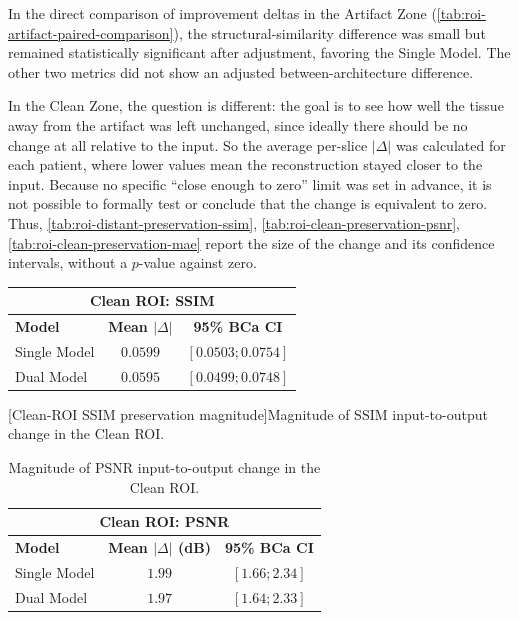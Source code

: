 In the direct comparison of improvement deltas in the Artifact Zone (\autoref{tab:roi-artifact-paired-comparison}), the structural-similarity difference was small but remained statistically significant after adjustment, favoring the Single Model. The other two metrics did not show an adjusted between-architecture difference.

In the Clean Zone, the question is different: the goal is to see how well the tissue away from the artifact was left unchanged, since ideally there should be no change at all relative to the input. So the average per-slice $|\Delta|$ was calculated for each patient, where lower values mean the reconstruction stayed closer to the input. Because no specific ``close enough to zero'' limit was set in advance, it is not possible to formally test or conclude that the change is equivalent to zero. Thus, \autoref{tab:roi-distant-preservation-ssim}, \autoref{tab:roi-clean-preservation-psnr}, \autoref{tab:roi-clean-preservation-mae} report the size of the change and its confidence intervals, without a $p$-value against zero.

\begin{table}[htbp]
\centering
\small
\begin{tabular}{lcc}
\multicolumn{3}{c}{\textbf{Clean ROI: SSIM}} \\[3pt]
\toprule
\textbf{Model} & \textbf{Mean $|\Delta|$} & \textbf{95\% BCa CI} \\
\midrule
Single Model & $0.0599$ & $[0.0503; 0.0754]$ \\
Dual Model & $0.0595$ & $[0.0499; 0.0748]$ \\
\bottomrule
\end{tabular}
\captionsetup{skip=2pt}
[Clean-ROI SSIM preservation magnitude]{Magnitude of SSIM input-to-output change in the Clean ROI.}
\label{tab:roi-distant-preservation-ssim}
\end{table}

\begin{table}[htbp]
\centering
\small
\begin{tabular}{lcc}
\multicolumn{3}{c}{\textbf{Clean ROI: PSNR}} \\[3pt]
\toprule
\textbf{Model} & \textbf{Mean $|\Delta|$ (dB)} & \textbf{95\% BCa CI} \\
\midrule
Single Model & $1.99$ & $[1.66; 2.34]$ \\
Dual Model & $1.97$ & $[1.64; 2.33]$ \\
\bottomrule
\end{tabular}
\captionsetup{skip=2pt}
\caption[Clean-ROI PSNR preservation magnitude]{Magnitude of PSNR input-to-output change in the Clean ROI.}
\label{tab:roi-clean-preservation-psnr}
\end{table}

